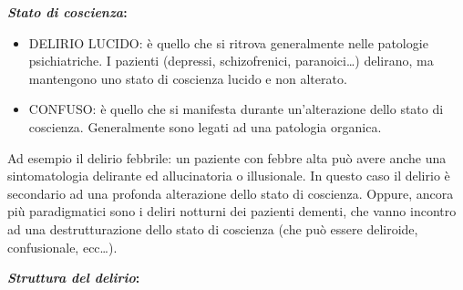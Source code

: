 \textbf{\emph{Stato di coscienza}: }

\begin{itemize}
\item
  DELIRIO LUCIDO: è quello che si ritrova generalmente nelle patologie
  psichiatriche. I pazienti (depressi, schizofrenici, paranoici\ldots{})
  delirano, ma mantengono uno stato di coscienza lucido e non alterato.
\item
  CONFUSO: è quello che si manifesta durante un'alterazione dello stato
  di coscienza. Generalmente sono legati ad una patologia organica.
\end{itemize}

Ad esempio il delirio febbrile: un paziente con febbre alta può avere
anche una sintomatologia delirante ed allucinatoria o illusionale. In
questo caso il delirio è secondario ad una profonda alterazione dello
stato di coscienza. Oppure, ancora più paradigmatici sono i deliri
notturni dei pazienti dementi, che vanno incontro ad una
destrutturazione dello stato di coscienza (che può essere deliroide,
confusionale, ecc\ldots{}).

\textbf{\emph{Struttura del delirio}: }

